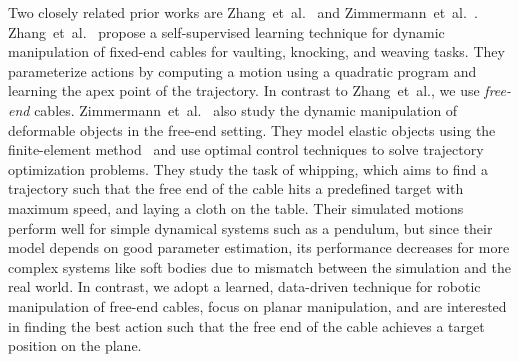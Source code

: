 \documentclass[letterpaper, 10 pt, conference]{ieeeconf}  %
\newcommand{\remark}[3]{{\color{#2}[#1: #3]}}
\newcommand{\daniel}[1]{\remark{Daniel}{blue}{#1}}
\newcommand{\Lawrence}[1]{\remark{Lawrence}{orange}{#1}}
\newcommand{\raven}[1]{\remark{Raven}{britishracinggreen}{#1}}
\begin{document}



Two closely related prior works are Zhang~et~al.~\cite{harry_rope_2021} and Zimmermann~et~al.~\cite{zimmermanndynamic}. Zhang~et~al.~\cite{harry_rope_2021} propose a self-supervised learning technique for dynamic manipulation of fixed-end cables for vaulting, knocking, and weaving tasks. They parameterize actions by computing a motion using a quadratic program and learning the apex point of the trajectory. In contrast to Zhang~et~al., we use \emph{free-end} cables. Zimmermann~et~al.~\cite{zimmermanndynamic} also study the dynamic manipulation of deformable objects in the free-end setting. They model elastic objects using the finite-element method~\cite{bathe2006finite} and use optimal control techniques
to solve trajectory optimization problems. They study the task of whipping, which aims to find a trajectory such that the free end of the cable hits a predefined target with maximum speed, and laying a cloth on the table. Their simulated motions perform well for simple dynamical systems such as a pendulum, but since their model depends on good parameter estimation, its performance decreases for more complex systems like soft bodies due to mismatch between the simulation and the real world. In contrast, we adopt a learned, data-driven technique for robotic manipulation of free-end cables, focus on planar manipulation, and are interested in finding the best action such that the free end of the cable achieves a target position on the plane.
\end{document}
